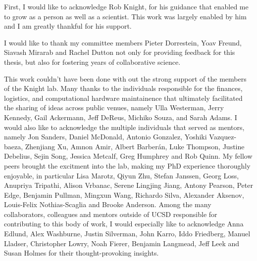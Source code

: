 \begin{frontmatter}
%
\tableofcontents

\renewcommand{\glossarysection}[2][]{
\newpage
\noindent
\centerline{LIST OF ABBREVIATIONS}
\addcontentsline{toc}{chapter}{List of Abbreviations}
}
\printglossary[title=List of Abbreviations,toctitle=List of Abbreviations,nonumberlist ]

\listoffigures  %
\listoftables   %


%
%
\begin{acknowledgements}
  First, I would like to acknowledge Rob Knight, for his guidance that enabled me to
  grow as a person as well as a scientist.  This work was largely enabled by him and
  I am greatly thankful for his support.

  I would like to thank my committee members Pieter Dorrestein, Yoav Freund,
  Siavash Mirarab and Rachel Dutton not only for providing feedback for this
  thesis, but also for fostering years of collaborative science.

  This work couldn't have been done with out the strong support of the members of the
  Knight lab. Many thanks to the individuals responsible for the finances, logistics,
  and computational hardware maintainence that ultimately facilitated the sharing
  of ideas across public venues, namely Ulla Westerman, Jerry Kennedy, Gail Ackermann,
  Jeff DeReus, Michiko Souza, and Sarah Adams.  I would also like to acknowledge the
  multiple individuals that served as mentors, namely Jon Sanders, Daniel McDonald,
  Antonio Gonzalez, Yoshiki Vazquez-baeza, Zhenjiang Xu, Amnon Amir, Albert Barberán,
  Luke Thompson, Justine Debelius, Sejin Song, Jessica Metcalf, Greg Humphrey and Rob Quinn.
  My fellow peers brought the excitment into the lab, making my PhD experience
  thoroughly enjoyable, in particular Lisa Marotz, Qiyun Zhu, Stefan Janssen, Georg Loss,
  Anupriya Tripathi, Alison Vrbanac, Serene Lingjing Jiang, Antony Pearson,
  Peter Edge, Benjamin Pullman, Mingxun Wang, Richardo Silva, Alexander Aksenov,
  Louis-Felix Nothias-Scaglia and Brooke Anderson. Among the many collaborators,
  colleagues and mentors outside of UCSD responsible for contributing to
  this body of work, I would especially like to acknowledge Anna Edlund, Alex Washburne,
  Justin Silverman, John Karro, Iddo Friedberg, Manuel Lladser, Christopher Lowry,
  Noah Fierer, Benjamin Langmead, Jeff Leek and Susan Holmes for their
  thought-provoking insights.


\end{acknowledgements}
\end{frontmatter}
